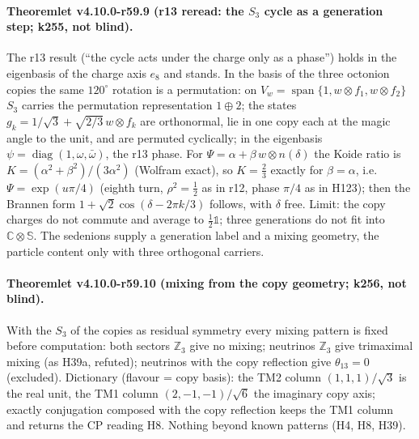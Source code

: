 \paragraph{Theoremlet v4.10.0-r59.9 (r13 reread: the \(S_3\) cycle as a generation step; k255, not blind).}
The r13 result (``the cycle acts under the charge only as a phase'') holds in the eigenbasis of the charge axis \(e_8\) and stands.  In the basis
of the three octonion copies the same \(120^\circ\) rotation is a permutation: on \(V_w=\operatorname{span}\{1,w\otimes f_1,w\otimes f_2\}\) \(S_3\) carries the
permutation representation \(1\oplus2\); the states \(g_k=1/\sqrt3+\sqrt{2/3}\,w\otimes f_k\) are orthonormal, lie in one copy each at the magic angle to
the unit, and are permuted cyclically; in the eigenbasis \(\psi=\operatorname{diag}(1,\omega,\bar\omega)\), the r13 phase.  For
\(\Psi=\alpha+\beta\,w\otimes n(\delta)\) the Koide ratio is \(K=(\alpha^2+\beta^2)/(3\alpha^2)\) (Wolfram exact), so \(K=\tfrac23\) exactly for \(\beta=\alpha\), i.e.\
\(\Psi=\exp(u\pi/4)\) (eighth turn, \(\rho^2=\tfrac12\) as in r12, phase \(\pi/4\) as in H123); then the Brannen form \(1+\sqrt2\cos(\delta-2\pi k/3)\) follows,
with \(\delta\) free.  Limit: the copy charges do not commute and average to \(\tfrac12\mathbb 1\); three generations do not fit into \(\mathbb C\otimes\mathbb S\).
The sedenions supply a generation label and a mixing geometry, the particle content only with three orthogonal carriers.

\paragraph{Theoremlet v4.10.0-r59.10 (mixing from the copy geometry; k256, not blind).}
With the \(S_3\) of the copies as residual symmetry every mixing pattern is fixed before computation: both sectors \(\mathbb Z_3\) give no mixing;
neutrinos \(\mathbb Z_3\) give trimaximal mixing (as H39a, refuted); neutrinos with the copy reflection give \(\theta_{13}=0\) (excluded).  Dictionary
(flavour = copy basis): the TM2 column \((1,1,1)/\sqrt3\) is the real unit, the TM1 column \((2,-1,-1)/\sqrt6\) the imaginary copy axis; exactly
conjugation composed with the copy reflection keeps the TM1 column and returns the CP reading H8.  Nothing beyond known patterns (H4, H8, H39).

